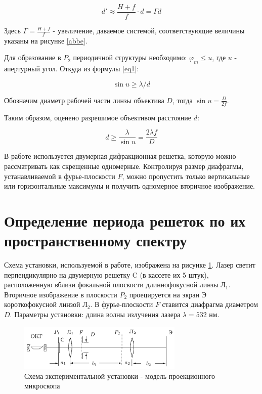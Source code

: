\documentclass[a4paper,12pt]{article}
\begin{document}
\begin{equation}
d' \approx \frac{H + f}{f} \cdot d = \Gamma d
\label{eq2}
\end{equation}

Здесь $\Gamma = \frac{H+f}{f}$ - увеличение, даваемое системой, соответствующие величины указаны на рисунке \ref{abbe}. 

Для образование в $P_2$ периодичной структуры необходимо: $\varphi_m \le u$, где $u$ - апертурный угол. Откуда из формулы \eqref{eq1}: 

\[ \sin u \ge \lambda/d \]

Обозначим диаметр рабочей части линзы объектива $D$, тогда $\sin u = \frac{D}{2f}$.

Таким образом, оценено разрешимое объективом расстояние $d$:

\begin{equation}
d \ge \frac{\lambda}{\sin u} = \frac{2\lambda f}{D}
\label{eq3}
\end{equation} 

В работе используется двумерная дифракционная решетка, которую можно рассматривать как скрещенные одномерные. Контролируя размер диафрагмы, устанавливаемой в фурье-плоскости $F$, можно пропустить только вертикальные или горизонтальные максимумы и получить одномерное вторичное изображение. 

\section*{Определение периода решеток по их пространственному спектру}

	Схема установки, используемой в работе, изображена на рисунке \ref{shema}. Лазер светит перпендикулярно на двумерную решетку C (в кассете их 5 штук), расположенную вблизи фокальной плоскости длиннофокусной линзы $\text{Л}_1$. Вторичное изображение в плоскости $P_2$ проецируется на экран Э короткофокусной линзой $\text{Л}_2$. В фурье-плоскости $F$ ставится диафрагма диаметром $D$. Параметры установки: длина волны излучения лазера $\lambda = 532$ нм.

\begin{figure}[h]
	\centering	
	\includegraphics[width=0.7\textwidth]{shema.png}
	\caption{Схема экспериментальной установки - модель проекционного микроскопа}
	\label{shema}
\end{figure}
\end{document}
